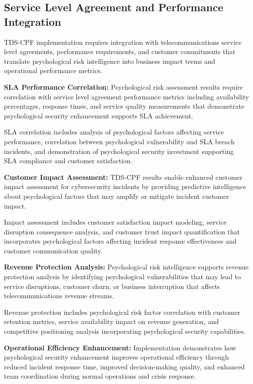 \documentclass[10pt, twocolumn]{article}
\begin{document}
\subsection{Service Level Agreement and Performance Integration}

TDS-CPF implementation requires integration with telecommunications service level agreements, performance requirements, and customer commitments that translate psychological risk intelligence into business impact terms and operational performance metrics.

\textbf{SLA Performance Correlation:} Psychological risk assessment results require correlation with service level agreement performance metrics including availability percentages, response times, and service quality measurements that demonstrate psychological security enhancement supports SLA achievement.

SLA correlation includes analysis of psychological factors affecting service performance, correlation between psychological vulnerability and SLA breach incidents, and demonstration of psychological security investment supporting SLA compliance and customer satisfaction.

\textbf{Customer Impact Assessment:} TDS-CPF results enable enhanced customer impact assessment for cybersecurity incidents by providing predictive intelligence about psychological factors that may amplify or mitigate incident customer impact.

Impact assessment includes customer satisfaction impact modeling, service disruption consequence analysis, and customer trust impact quantification that incorporates psychological factors affecting incident response effectiveness and customer communication quality.

\textbf{Revenue Protection Analysis:} Psychological risk intelligence supports revenue protection analysis by identifying psychological vulnerabilities that may lead to service disruptions, customer churn, or business interruption that affects telecommunications revenue streams.

Revenue protection includes psychological risk factor correlation with customer retention metrics, service availability impact on revenue generation, and competitive positioning analysis incorporating psychological security capabilities.

\textbf{Operational Efficiency Enhancement:} Implementation demonstrates how psychological security enhancement improves operational efficiency through reduced incident response time, improved decision-making quality, and enhanced team coordination during normal operations and crisis response.
\end{document}
